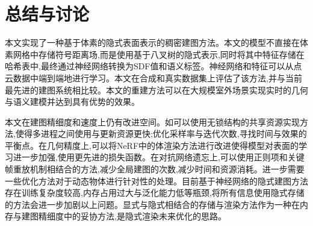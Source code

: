 \section{总结与讨论}\label{conclusion}

本文实现了一种基于体素的隐式表面表示的稠密建图方法。本文的模型不直接在体素网格中存储符号距离场,而是使用基于八叉树的隐式表示,同时将其中特征存储在哈希表中,最终通过神经网络转换为SDF值和语义标签。神经网络和特征可以从点云数据中端到端地进行学习。本文在合成和真实数据集上评估了该方法,并与当前最先进的建图系统相比较。本文的重建方法可以在大规模室外场景实现实时的几何与语义建模并达到具有优势的效果。

本文在建图精细度和速度上仍有改进空间。如可以使用无锁结构的共享资源实现方法,使得多进程之间使用与更新资源更快;优化采样率与迭代次数,寻找时间与效果的平衡点。在几何精度上,可以将NeRF中的体渲染方法进行改进使得模型对表面的学习进一步加强,使用更先进的损失函数。在对抗网络遗忘上,可以使用正则项和关键帧重放机制相结合的方法,减少全局建图的次数,减少时间和资源消耗。进一步需要一些优化方法对于动态物体进行针对性的处理。目前基于神经网络的隐式建图方法存在训练复杂度较高,内存占用过大与泛化能力低等瓶颈,将所有信息使用隐式存储的方法会进一步加剧以上问题。显式与隐式相结合的存储与渲染方法作为一种在内存与建图精细度中的妥协方法,是隐式渲染未来优化的思路。
